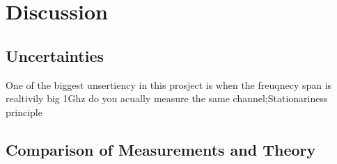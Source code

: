 \chapter{Discussion}
\section{Uncertainties}
One of the biggest unsertiency in this prosject is when the freuqnecy span is realtivily big 1Ghz do you acually measure the same channel;Stationariness principle
\section{Comparison of Measurements and Theory}